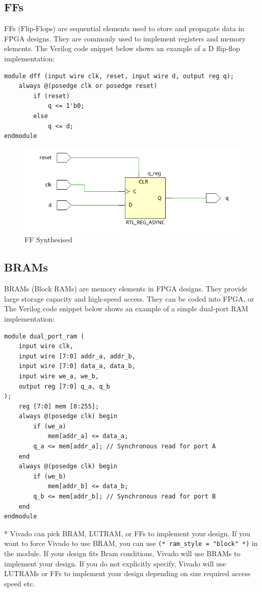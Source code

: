 \documentclass{report}
\begin{document}
\subsection{FFs}
FFs (Flip-Flops) are sequential elements used to store and propagate data in FPGA designs. They are commonly used to implement registers and memory elements. The Verilog code snippet below shows an example of a D flip-flop implementation:

\begin{verbatim}
module dff (input wire clk, reset, input wire d, output reg q);
    always @(posedge clk or posedge reset)
        if (reset)
            q <= 1'b0;
        else
            q <= d;
endmodule
\end{verbatim}

\begin{figure}[ht]
    \includegraphics[width=0.6\linewidth]{images/ff.png}
    \centering
    \caption{FF Synthesised}
    \label{fig:ff}
\end{figure}

\subsection{BRAMs}
BRAMs (Block RAMs) are memory elements in FPGA designs. They provide large storage capacity and high-speed access. They can be coded into FPGA, or The Verilog code snippet below shows an example of a simple dual-port RAM implementation:
\begin{verbatim}
module dual_port_ram (
    input wire clk,
    input wire [7:0] addr_a, addr_b,
    input wire [7:0] data_a, data_b,
    input wire we_a, we_b,
    output reg [7:0] q_a, q_b
);
    reg [7:0] mem [0:255];
    always @(posedge clk) begin
        if (we_a)
            mem[addr_a] <= data_a;
        q_a <= mem[addr_a]; // Synchronous read for port A
    end
    always @(posedge clk) begin
        if (we_b)
            mem[addr_b] <= data_b;
        q_b <= mem[addr_b]; // Synchronous read for port B
    end
endmodule
\end{verbatim}

* Vivado can pick BRAM, LUTRAM, or FFs to implement your design. If you want to force Vivado to use BRAM, you can use \texttt{(* ram\_style = "block" *)} in the module. If your design fits Bram conditions, Vivado will use BRAMs to implement your design. If you do not explicitly specify, Vivado will use LUTRAMs or FFs to implement your design depending on size required access speed etc.
\end{document}
